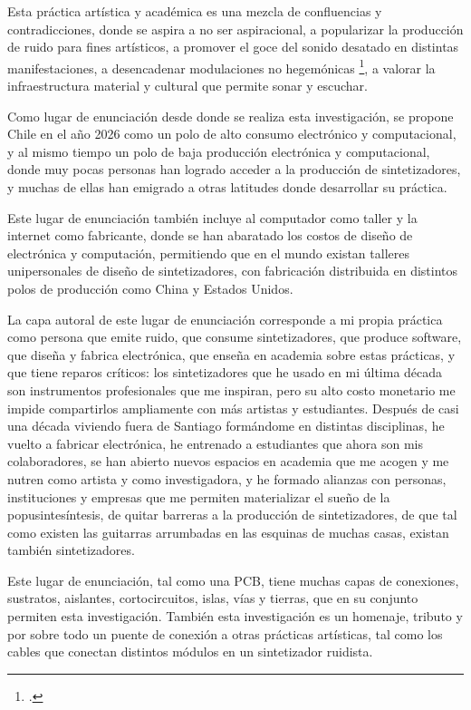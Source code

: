 \documentclass[../candidatura.tex]{subfiles}
\begin{document}
Esta práctica artística y académica es una mezcla de confluencias y contradicciones, donde se aspira a no ser aspiracional, a popularizar la producción de ruido para fines artísticos, a promover el goce del sonido desatado en distintas manifestaciones, a desencadenar modulaciones no hegemónicas \footcite{mendivil_contra_2023}, a valorar la infraestructura material y cultural que permite sonar y escuchar.

Como lugar de enunciación desde donde se realiza esta investigación, se propone Chile en el año 2026 como un polo de alto consumo electrónico y computacional, y al mismo tiempo un polo de baja producción electrónica y computacional, donde muy pocas personas han logrado acceder a la producción de sintetizadores, y muchas de ellas han emigrado a otras latitudes donde desarrollar su práctica.

Este lugar de enunciación también incluye al computador como taller y la internet como fabricante, donde se han abaratado los costos de diseño de electrónica y computación, permitiendo que en el mundo existan talleres unipersonales de diseño de sintetizadores, con fabricación distribuida en distintos polos de producción como China y Estados Unidos.

La capa autoral de este lugar de enunciación corresponde a mi propia práctica como persona que emite ruido, que consume sintetizadores, que produce software, que diseña y fabrica electrónica, que enseña en academia sobre estas prácticas, y que tiene reparos críticos: los sintetizadores que he usado en mi última década son instrumentos profesionales que me inspiran, pero su alto costo monetario me impide compartirlos ampliamente con más artistas y estudiantes. Después de casi una década viviendo fuera de Santiago formándome en distintas disciplinas, he vuelto a fabricar electrónica, he entrenado a estudiantes que ahora son mis colaboradores, se han abierto nuevos espacios en academia que me acogen y me nutren como artista y como investigadora, y he formado alianzas con personas, instituciones y empresas que me permiten materializar el sueño de la popusintesíntesis, de quitar barreras a la producción de sintetizadores, de que tal como existen las guitarras arrumbadas en las esquinas de muchas casas, existan también sintetizadores.

Este lugar de enunciación, tal como una PCB, tiene muchas capas de conexiones, sustratos, aislantes, cortocircuitos, islas, vías y tierras, que en su conjunto permiten esta investigación. También esta investigación es un homenaje, tributo y por sobre todo un puente de conexión a otras prácticas artísticas, tal como los cables que conectan distintos módulos en un sintetizador ruidista.
\end{document}
